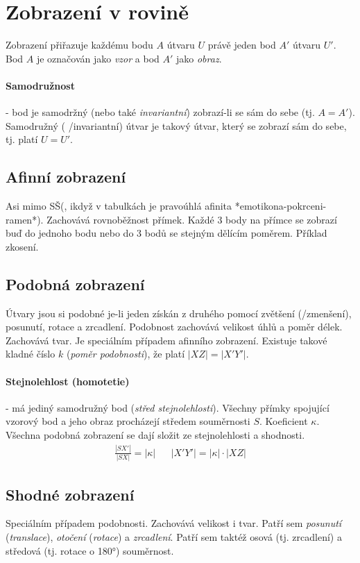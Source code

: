 \documentclass[12pt]{article}
\begin{document}
\section{Zobrazení v rovině}
Zobrazení přiřazuje každému bodu $A$ útvaru $U$ právě jeden bod $A'$ útvaru $U'$. Bod $A$ je označován jako \emph{vzor} a bod $A'$ jako \emph{obraz}.
\paragraph{Samodružnost} - bod je samodržný (nebo také \emph{invariantní}) zobrazí-li se sám do sebe (tj. $A =A'$). Samodružný ( /invariantní) útvar je takový útvar, který se zobrazí sám do sebe, tj. platí $U=U'$.
\subsection{Afinní zobrazení}
Asi mimo SŠ(, ikdyž v tabulkách je pravoúhlá afinita *emotikona-pokrceni-ramen*). Zachovává rovnoběžnost přímek. Každé 3 body na přímce se zobrazí buď do jednoho bodu nebo do 3 bodů se stejným dělícím poměrem. Příklad zkosení.
\subsection{Podobná zobrazení}
Útvary jsou si podobné je-li jeden získán z druhého pomocí zvětšení (/zmenšení), posunutí, rotace a zrcadlení. Podobnost zachovává velikost úhlů a poměr délek. Zachovává tvar. Je speciálním případem afinního zobrazení. Existuje takové kladné číslo $k$ (\emph{poměr podobnosti}), že platí $|XZ| = |X'Y'|$.
\paragraph{Stejnolehlost (homotetie)} - má jediný samodružný bod (\emph{střed stejnolehlosti}). Všechny přímky spojující vzorový bod a jeho obraz procházejí středem souměrnosti $S$. Koeficient $\kappa$. Všechna podobná zobrazení se dají složit ze stejnolehlosti a shodnosti.
\begin{align}
\frac{|SX'|}{|SX|} = |\kappa| && |X'Y'| = |\kappa|\cdot|XZ|
\end{align} 
\subsection{Shodné zobrazení}
Speciálním případem podobnosti. Zachovává velikost i tvar. Patří sem \emph{posunutí} (\emph{translace}),  \emph{otočení} (\emph{rotace}) a \emph{zrcadlení}. Patří sem taktéž osová (tj. zrcadlení) a středová (tj. rotace o 180°) souměrnost.
\end{document}
